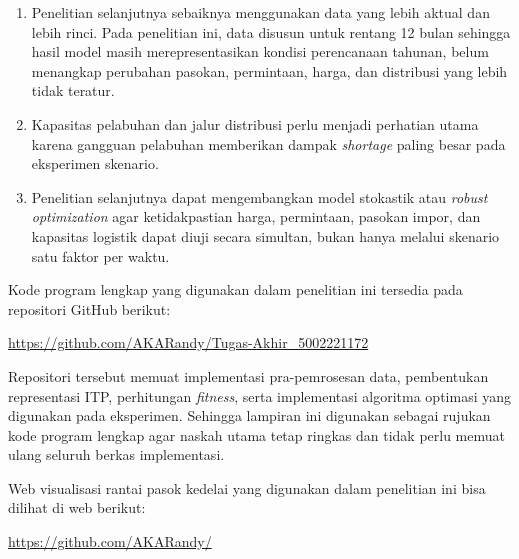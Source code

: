 \documentclass{file/TA-ITS}
\theoremstyle{definition}
\theoremstyle{definition}
\theoremstyle{plain}
\begin{document}
\begin{enumerate}
    \item Penelitian selanjutnya sebaiknya menggunakan data yang lebih aktual dan lebih rinci. Pada penelitian ini, data disusun untuk rentang 12 bulan sehingga hasil model masih merepresentasikan kondisi perencanaan tahunan, belum menangkap perubahan pasokan, permintaan, harga, dan distribusi yang lebih tidak teratur.

    \item Kapasitas pelabuhan dan jalur distribusi perlu menjadi perhatian utama karena gangguan pelabuhan memberikan dampak \textit{shortage} paling besar pada eksperimen skenario.

    \item Penelitian selanjutnya dapat mengembangkan model stokastik atau \textit{robust optimization} agar ketidakpastian harga, permintaan, pasokan impor, dan kapasitas logistik dapat diuji secara simultan, bukan hanya melalui skenario satu faktor per waktu.
\end{enumerate}



\pagebreak

\DaftarPustaka

\DaftarLampiran


\noindent Kode program lengkap yang digunakan dalam penelitian ini tersedia pada repositori GitHub berikut:

\begin{center}
\url{https://github.com/AKARandy/Tugas-Akhir_5002221172}
\end{center}

\noindent Repositori tersebut memuat implementasi pra-pemrosesan data, pembentukan representasi ITP, perhitungan \textit{fitness}, serta implementasi algoritma optimasi yang digunakan pada eksperimen. Sehingga lampiran ini digunakan sebagai rujukan kode program lengkap agar naskah utama tetap ringkas dan tidak perlu memuat ulang seluruh berkas implementasi.

\noindent Web visualisasi rantai pasok kedelai yang digunakan dalam penelitian ini bisa dilihat di web berikut:

\begin{center}
\url{https://github.com/AKARandy/}
\end{center}
\end{document}
